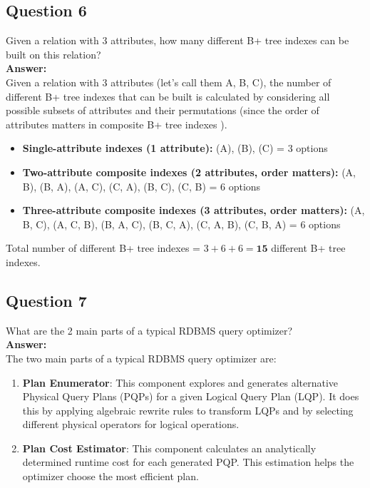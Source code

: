 \documentclass{article}
\begin{document}
\subsection*{Question 6}
Given a relation with 3 attributes, how many different B+ tree indexes can be built on this relation?\\

\textbf{Answer:}\\

Given a relation with 3 attributes (let's call them A, B, C), the number of different B+ tree indexes that can be built is calculated by considering all possible subsets of attributes and their permutations (since the order of attributes matters in composite B+ tree indexes ).\\

\begin{itemize}
    \item \textbf{Single-attribute indexes (1 attribute):}
        (A), (B), (C) = 3 options
    \item \textbf{Two-attribute composite indexes (2 attributes, order matters):}
        (A, B), (B, A), (A, C), (C, A), (B, C), (C, B) = 6 options
    \item \textbf{Three-attribute composite indexes (3 attributes, order matters):}
        (A, B, C), (A, C, B), (B, A, C), (B, C, A), (C, A, B), (C, B, A) = 6 options
\end{itemize}

Total number of different B+ tree indexes = $3 + 6 + 6 = \textbf{15}$ different B+ tree indexes.\\

\subsection*{Question 7}

What are the 2 main parts of a typical RDBMS query optimizer?\\

\textbf{Answer:}\\

The two main parts of a typical RDBMS query optimizer are:\\

\begin{enumerate}
    \item \textbf{Plan Enumerator}: This component explores and generates alternative Physical Query Plans (PQPs) for a given Logical Query Plan (LQP). It does this by applying algebraic rewrite rules to transform LQPs and by selecting different physical operators for logical operations.
    \item \textbf{Plan Cost Estimator}: This component calculates an analytically determined runtime cost for each generated PQP. This estimation helps the optimizer choose the most efficient plan.
\end{enumerate}
\end{document}
